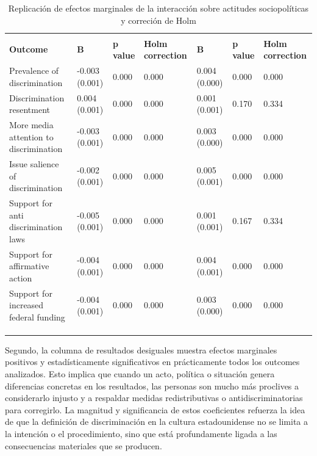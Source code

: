 \documentclass[
  13pt,
  a4paper,
]{article}
\begin{document}
\begin{table}[!h]
\centering\centering
\caption{\label{tab:table1}\label{tab:table1} Replicación de efectos marginales de la interacción sobre actitudes sociopolíticas y correción de Holm}
\centering
\fontsize{11}{13}\selectfont
\begin{tabu} to 
\toprule
{} &  &  \\
\cmidrule(l{3pt}r{3pt}){2-4} \cmidrule(l{3pt}r{3pt}){5-7}
\textbf{Outcome} & \textbf{B} & \textbf{p value} & \textbf{Holm correction} & \textbf{B} & \textbf{p value} & \textbf{Holm correction}\\
\midrule
Prevalence of discrimination & -0.003 (0.001) & 0.000 & 0.000 & 0.004 (0.000) & 0.000 & 0.000\\
Discrimination resentment & 0.004 (0.001) & 0.000 & 0.000 & 0.001 (0.001) & 0.170 & 0.334\\
More media attention to discrimination & -0.003 (0.001) & 0.000 & 0.000 & 0.003 (0.000) & 0.000 & 0.000\\
Issue salience of discrimination & -0.002 (0.001) & 0.000 & 0.000 & 0.005 (0.001) & 0.000 & 0.000\\
Support for anti discrimination laws & -0.005 (0.001) & 0.000 & 0.000 & 0.001 (0.001) & 0.167 & 0.334\\
\addlinespace
Support for affirmative action & -0.004 (0.001) & 0.000 & 0.000 & 0.004 (0.001) & 0.000 & 0.000\\
Support for increased federal funding & -0.004 (0.001) & 0.000 & 0.000 & 0.003 (0.000) & 0.000 & 0.000\\
\bottomrule
{}\\
\\
\\
\end{tabu}
\end{table}

Segundo, la columna de resultados desiguales muestra efectos marginales positivos y estadísticamente significativos en prácticamente todos los outcomes analizados. Esto implica que cuando un acto, política o situación genera diferencias concretas en los resultados, las personas son mucho más proclives a considerarlo injusto y a respaldar medidas redistributivas o antidiscriminatorias para corregirlo. La magnitud y significancia de estos coeficientes refuerza la idea de que la definición de discriminación en la cultura estadounidense no se limita a la intención o el procedimiento, sino que está profundamente ligada a las consecuencias materiales que se producen.
\end{document}
